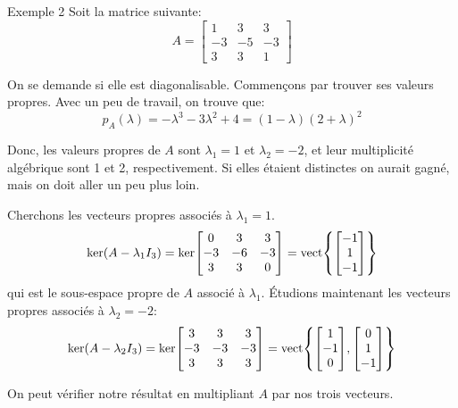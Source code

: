 \documentclass[a4paper]{article}
\begin{document}
\begin{parag}{Exemple 2}
    Soit la matrice suivante: 
    \[A = \begin{bmatrix} 1 & 3 & 3 \\ -3 & -5 & -3 \\ 3 & 3 & 1 \end{bmatrix} \]
    
    On se demande si elle est diagonalisable. Commençons par trouver ses valeurs propres. Avec un peu de travail, on trouve que: 
    \[p_A\left(\lambda\right) = -\lambda^3 - 3\lambda^2 + 4 = \left(1 - \lambda\right)\left(2 + \lambda\right)^2\]
    
    Donc, les valeurs propres de $A$ sont $\lambda_1 = 1$ et $\lambda_2 = -2$, et leur multiplicité algébrique sont 1 et 2, respectivement. Si elles étaient distinctes on aurait gagné, mais on doit aller un peu plus loin.

    Cherchons les vecteurs propres associés à $\lambda_1 = 1$. 
    \[\ker\left(A - \lambda_1 I_3\right) = \ker\begin{bmatrix} 0 & 3 & 3 \\ -3 & -6 & -3 \\ 3 & 3 & 0 \end{bmatrix} = \vect\left\{\begin{bmatrix} -1 \\ 1 \\ -1 \end{bmatrix} \right\}\]
    qui est le sous-espace propre de $A$ associé à $\lambda_1$. Étudions maintenant les vecteurs propres associés à $\lambda_2 = -2$: 
    \[\ker\left(A - \lambda_2 I_3\right) = \ker\begin{bmatrix} 3 & 3 & 3 \\ -3 & -3 & -3 \\ 3 & 3 & 3 \end{bmatrix} = \vect\left\{\begin{bmatrix} 1 \\ -1 \\ 0 \end{bmatrix}, \begin{bmatrix} 0 \\ 1 \\ -1 \end{bmatrix} \right\}\]
    
    On peut vérifier notre résultat en multipliant $A$ par nos trois vecteurs. 


\end{parag}
\end{document}
